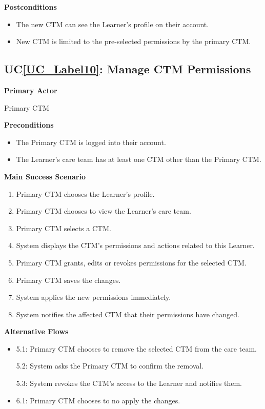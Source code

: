 \documentclass[12pt]{article}
\newcounter{ucnum} %
\newcommand{\ucref}[1]{UC\ref{#1}}
\begin{document}
\textbf{Postconditions}
\begin{itemize}
\item The new CTM can see the Learner's profile on their account.
\item New CTM is limited to the pre-selected permissions by the primary CTM.
\end{itemize}

 \label{UC_Label10}
\subsection{\ucref{UC_Label10}: Manage CTM Permissions}

\textbf{Primary Actor}

Primary CTM

\textbf{Preconditions}
\begin{itemize}
\item The Primary CTM is logged into their account.
\item The Learner's care team has at least one CTM other than the Primary CTM.
\end{itemize}

\textbf{Main Success Scenario}
\begin{enumerate}
\item Primary CTM chooses the Learner's profile.
\item Primary CTM chooses to view the Learner's care team.
\item Primary CTM selects a CTM.
\item System displays the CTM's permissions and actions related to this Learner.
\item Primary CTM grants, edits or revokes permissions for the selected CTM.
\item Primary CTM saves the changes.
\item System applies the new permissions immediately.
\item System notifies the affected CTM that their permissions have changed.
\end{enumerate}

\textbf{Alternative Flows}
\begin{itemize}
\item 5.1: Primary CTM chooses to remove the selected CTM from the care team.

5.2: System asks the Primary CTM to confirm the removal.

5.3: System revokes the CTM's access to the Learner and notifies them.

\item 6.1: Primary CTM chooses to no apply the changes.
\end{itemize}
\end{document}
